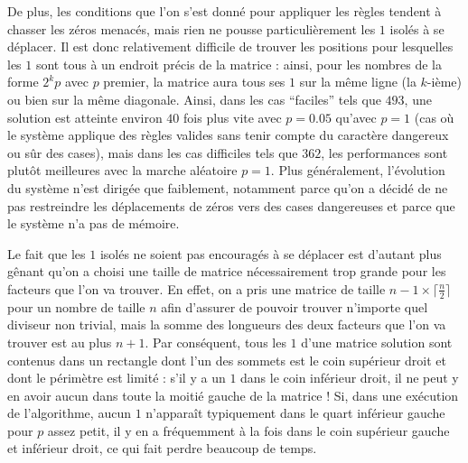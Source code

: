 \documentclass[11pt, openany]{article}
\begin{document}
\medskip

De plus, les conditions que l'on s'est donné pour appliquer les règles tendent à chasser les zéros menacés, mais rien ne pousse particulièrement les $1$ isolés à se déplacer. Il est donc relativement difficile de trouver les positions pour lesquelles les $1$ sont tous à un endroit précis de la matrice : ainsi, pour les nombres de la forme $2^kp$ avec $p$ premier, la matrice aura tous ses $1$ sur la même ligne (la $k$-ième) ou bien sur la même diagonale. Ainsi, dans les cas ``faciles'' tels que $493$, une solution est atteinte environ $40$ fois plus vite avec $p=0.05$ qu'avec $p=1$ (cas où le système applique des règles valides sans tenir compte du caractère dangereux ou sûr des cases), mais dans les cas difficiles tels que $362$, les performances sont plutôt meilleures avec la marche aléatoire $p=1$. Plus généralement, l'évolution du système n'est dirigée que faiblement, notamment parce qu'on a décidé de ne pas restreindre les déplacements de zéros vers des cases dangereuses et parce que le système n'a pas de mémoire.

\medskip
 
Le fait que les $1$ isolés ne soient pas encouragés à se déplacer est d'autant plus gênant qu'on a choisi une taille de matrice nécessairement trop grande pour les facteurs que l'on va trouver. En effet, on a pris une matrice de taille $n-1 \times \lceil \frac{n}{2} \rceil$ pour un nombre de taille $n$ afin d'assurer de pouvoir trouver n'importe quel diviseur non trivial, mais la somme des longueurs des deux facteurs que l'on va trouver est au plus $n+1$. Par conséquent, tous les $1$ d'une matrice solution sont contenus dans un rectangle dont l'un des sommets est le coin supérieur droit et dont le périmètre est limité : s'il y a un $1$ dans le coin inférieur droit, il ne peut y en avoir aucun dans toute la moitié gauche de la matrice ! Si, dans une exécution de l'algorithme, aucun $1$ n'apparaît typiquement dans le quart inférieur gauche pour $p$ assez petit, il y en a fréquemment à la fois dans le coin supérieur gauche et inférieur droit, ce qui fait perdre beaucoup de temps. 
\end{document}
